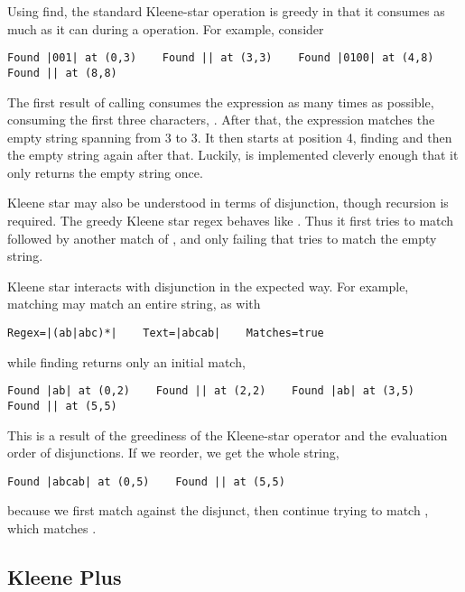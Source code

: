 Using find, the standard Kleene-star operation is greedy in that it
consumes as much as it can during a  operation.  For
example, consider
%
\begin{verbatim}
Found |001| at (0,3)    Found || at (3,3)    Found |0100| at (4,8)
Found || at (8,8)
\end{verbatim}
%
The first result of calling  consumes the expression
\code{[01]} as many times as possible, consuming the first three
characters, .  After that, the expression matches the empty
string spanning from 3 to 3.  It then starts at position 4, finding
 and then the empty string again after that.  Luckily,
 is implemented cleverly enough that it only returns the
empty string once.  

Kleene star may also be understood in terms of disjunction, though
recursion is required.  The greedy Kleene star regex
 behaves like .
Thus it first tries to match  followed by another match of
, and only failing that tries to match the
empty string.

Kleene star interacts with disjunction in the expected way.  For
example, matching may match an entire string, as with
%
\begin{verbatim}
Regex=|(ab|abc)*|    Text=|abcab|    Matches=true
\end{verbatim}
%
while finding returns only an initial match, 
%
\begin{verbatim}
Found |ab| at (0,2)    Found || at (2,2)    Found |ab| at (3,5)
Found || at (5,5)
\end{verbatim}
%
This is a result of the greediness of the Kleene-star operator
and the evaluation order of disjunctions.  If we reorder, we 
get the whole string,
%
\begin{verbatim}
Found |abcab| at (0,5)    Found || at (5,5)
\end{verbatim}
%
because we first match  against the disjunct, then continue
trying to match , which matches .

\subsection{Kleene Plus}

